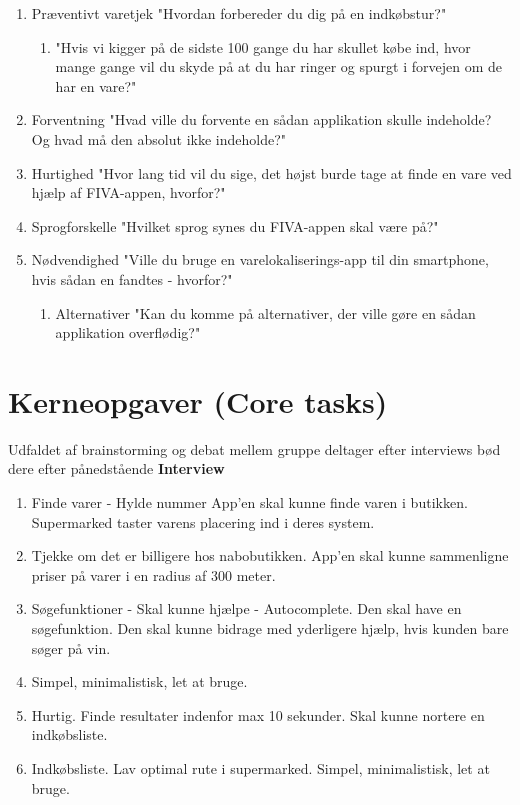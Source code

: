 \documentclass[12pt]{article}
\begin{document}
\begin{enumerate}
\item Præventivt varetjek "Hvordan forbereder du dig på en indkøbstur?"

\begin{enumerate}
\item "Hvis vi kigger på de sidste 100 gange du har skullet købe ind, hvor mange gange vil du skyde på at du har ringer og spurgt i forvejen om de har en vare?"
\end{enumerate}

\item Forventning "Hvad ville du forvente en sådan applikation skulle indeholde? Og hvad må den absolut ikke indeholde?"
\item Hurtighed	"Hvor lang tid vil du sige, det højst burde tage at finde en vare ved hjælp af FIVA-appen, hvorfor?"
\item Sprogforskelle "Hvilket sprog synes du FIVA-appen skal være på?"
\item Nødvendighed "Ville du bruge en varelokaliserings-app til din smartphone, hvis sådan en fandtes - hvorfor?"

\begin{enumerate}
\item Alternativer "Kan du komme på alternativer, der ville gøre en sådan applikation overflødig?"
\end{enumerate}

\end{enumerate}

\section*{Kerneopgaver (Core tasks)}
Udfaldet af brainstorming og debat mellem gruppe deltager efter interviews b\o d dere efter p\aa nedst\aa ende  
\textbf{Interview}\\

\begin{enumerate}
\item Finde varer - Hylde nummer App'en skal kunne finde varen i butikken. Supermarked taster varens placering ind i deres system.
\item Tjekke om det er billigere hos nabobutikken. App'en skal kunne sammenligne priser på varer i en radius af 300 meter.
\item Søgefunktioner - Skal kunne hjælpe - Autocomplete. Den skal have en søgefunktion. Den skal kunne bidrage med yderligere hjælp, 
hvis kunden bare søger på vin. 
\item Simpel, minimalistisk, let at bruge.
\item Hurtig. Finde resultater indenfor max 10 sekunder. Skal kunne nortere en indkøbsliste.
\item Indkøbsliste. Lav optimal rute i supermarked. Simpel, minimalistisk, let at bruge. 
\end{enumerate}
\end{document}

